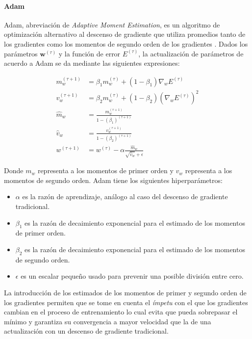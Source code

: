             \paragraph{Adam}\label{sec:adam}
            Adam, abreviación de \textit{Adaptive Moment Estimation}, es un algoritmo de optimización alternativo al descenso de 
            gradiente que utiliza promedios tanto de los gradientes como los momentos de segundo orden de los gradientes \cite{kingma2014adam}. Dados 
            los parámetros $\mathbf{w}^{(\tau)}$ y la función de error $E^{(\tau)}$, la actualización de parámetros de acuerdo 
            a Adam se da mediante las siguientes expresiones:

            \begin{align}
                m_w^{(\tau + 1)} &= \beta_1 m_w^{(\tau)} + (1 - \beta_1) \nabla_w E^{(\tau)} \nonumber \\
                v_w^{(\tau + 1)} &= \beta_2 m_w^{(\tau)} + (1 - \beta_2) (\nabla_w E^{(\tau)})^2 \nonumber \\
                \hat{m}_w &= \frac{m_w^{(\tau + 1)}}{1 - (\beta_1)^{(\tau + 1)} } \nonumber \\
                \hat{v}_w &= \frac{v_w^{(\tau + 1)}}{1 - (\beta_2)^{(\tau + 1)} } \nonumber \\
                w^{(\tau + 1)} &= w^{(\tau)} - \alpha \frac{\hat{m}_w}{\sqrt{\hat{v}_w} + \epsilon} \label{eq:adam}
            \end{align}

            Donde $m_w$ representa a los momentos de primer orden y $v_w$ representa a los momentos de segundo orden. Adam 
            tiene los siguientes hiperparámetros:

            \begin{itemize}
                \item $\alpha$ es la razón de aprendizaje, análogo al caso del descenso de gradiente tradicional.
                \item $\beta_1$ es la razón de decaimiento exponencial para el estimado de los momentos de primer orden.
                \item $\beta_2$ es la razón de decaimiento exponencial para el estimado de los momentos de segundo orden.
                \item $\epsilon$ es un escalar pequeño usado para prevenir una posible división entre cero.
            \end{itemize}

            La introducción de los estimados de los momentos de primer y segundo orden de los gradientes permiten que 
            se tome en cuenta el \textit{ímpetu} con el que los gradientes cambian en el proceso de entrenamiento lo cual 
            evita que pueda sobrepasar el mínimo y garantiza su convergencia a mayor velocidad que la de una actualización 
            con un descenso de gradiente tradicional.
            

